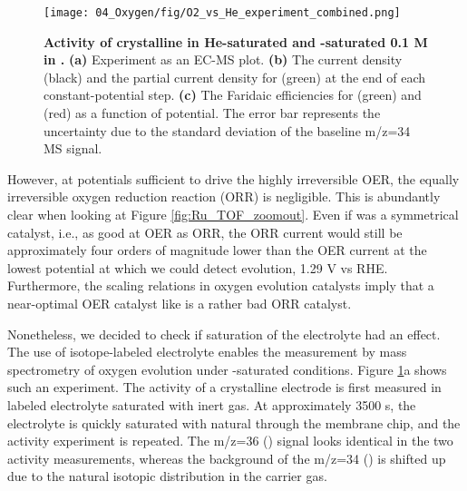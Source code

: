 \begin{figure}[h!]
	\texttt{[image: 04\_Oxygen/fig/O2\_vs\_He\_experiment\_combined.png]}
	\caption{\textbf{Activity of crystalline  in He-saturated and -saturated 0.1 M  in .} \textbf{(a)} Experiment as an EC-MS plot. \textbf{(b)} The current density (black) and the partial current density for  (green) at the end of each constant-potential step. \textbf{(c)} The Faridaic efficiencies for  (green) and  (red) as a function of potential. The error bar represents the uncertainty due to the standard deviation of the baseline m/z=34 MS signal.}
	\label{fig:He_vs_O2}
\end{figure}

However, at potentials sufficient to drive the highly irreversible OER, the equally irreversible oxygen reduction reaction (ORR) is negligible. This is abundantly clear when looking at Figure \ref{fig:Ru_TOF_zoomout}. Even if  was a symmetrical catalyst, i.e., as good at OER as ORR, the ORR current would still be approximately four orders of magnitude lower than the OER current at the  lowest potential at which we could detect  evolution, 1.29 V vs RHE. Furthermore, the scaling relations in oxygen evolution catalysts imply that a near-optimal OER catalyst like  is a rather bad ORR catalyst\cite{Busch2016}. 

Nonetheless, we decided to check if  saturation of the electrolyte had an effect. The use of isotope-labeled electrolyte enables the measurement by mass spectrometry of oxygen evolution under -saturated conditions. Figure \ref{fig:He_vs_O2}a shows such an experiment. The activity of a crystalline  electrode is first measured in labeled electrolyte saturated with inert gas. At approximately 3500 s, the electrolyte is quickly saturated with natural  through the membrane chip, and the activity experiment is repeated. The m/z=36 () signal looks identical in the two activity measurements, whereas the background of the m/z=34 () is shifted up due to the natural isotopic distribution in the  carrier gas. 

